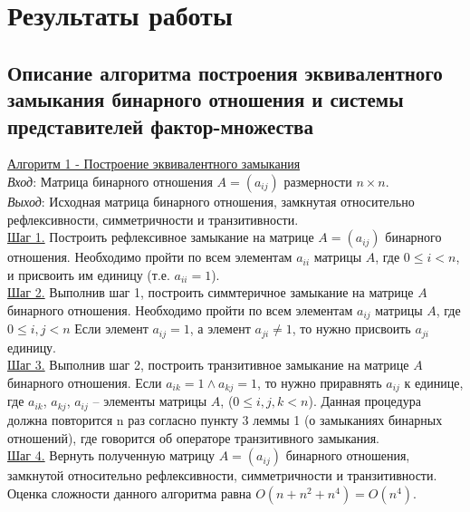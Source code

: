 \documentclass[bachelor, och, labwork]{shiza}
\begin{document}
\section{Результаты работы}
    \subsection{Описание алгоритма построения эквивалентного замыкания бинарного отношения и системы представителей
    фактор-множества}

        \underline{Алгоритм 1 - Построение эквивалентного замыкания}\\
            \textit{Вход}: Матрица бинарного отношения $A = (a_{ij})$ размерности $n \times n$.\\
            \textit{Выход}: Исходная матрица бинарного отношения, замкнутая относительно рефлексивности, симметричности и
            транзитивности.\\
            \underline{Шаг 1.} Построить рефлексивное замыкание на матрице $A = (a_{ij})$ бинарного отношения.
            Необходимо пройти по всем элементам $a_{ii}$ матрицы $A$, где $0 \leq i < n$, и присвоить им единицу (т.е. $a_{ii}=1$).\\
            \underline{Шаг 2.} Выполнив шаг 1, построить симмтеричное замыкание на матрице $A$ бинарного отношения. 
            Необходимо пройти по всем элементам  $a_{ij}$ матрицы $A$, где $0 \leq i,j < n$ Если элемент $a_{ij}=1$,
            а элемент $a_{ji} \neq 1$, то нужно присвоить $a_{ji}$ единицу.\\            
            \underline{Шаг 3.} Выполнив шаг 2, построить транзитивное замыкание на матрице $A$ бинарного отношения.
            Если $a_{ik} = 1 \wedge a_{kj} = 1$, то нужно приравнять $a_{ij}$ к единице, где $a_{ik}$, $a_{kj}$, $a_{ij}$ --
            элементы матрицы $A$, ($0 \leq i,j,k < n$). Данная процедура должна повторится n раз согласно пункту 3 леммы 1 
            (о замыканиях бинарных отношений), где говорится об операторе транзитивного замыкания.\\
            \underline{Шаг 4.} Вернуть полученную матрицу $A = (a_{ij})$ бинарного отношения, замкнутой относительно 
            рефлексивности, симметричности и транзитивности.\\
            
            Оценка сложности данного алгоритма равна $O(n + n^2 + n^4) = O(n^4)$.\\
\end{document}
